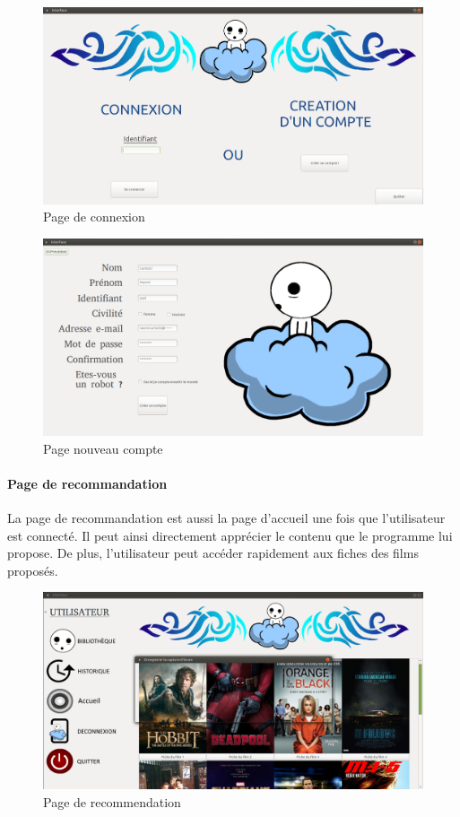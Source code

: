 \documentclass{article}
\begin{document}
\begin{figure}[H]
    \centering
    \includegraphics[scale=0.3]{Images/interface1.png}
    \caption{\label{1} Page de connexion}
\end{figure}

\begin{figure}[H]
    \centering
    \includegraphics[scale=0.3]{Images/interface5.png}
    \caption{\label{5} Page nouveau compte}
\end{figure}

\paragraph{Page de recommandation}
La page de recommandation est aussi la page d'accueil une fois que l'utilisateur est connecté. Il peut ainsi directement apprécier le contenu que le programme lui propose. De plus, l'utilisateur peut accéder rapidement aux fiches des films proposés.

\begin{figure}[H]
    \centering
    \includegraphics[scale=0.3]{Images/interface2.png}
    \caption{\label{2} Page de recommendation}
\end{figure}
\end{document}
